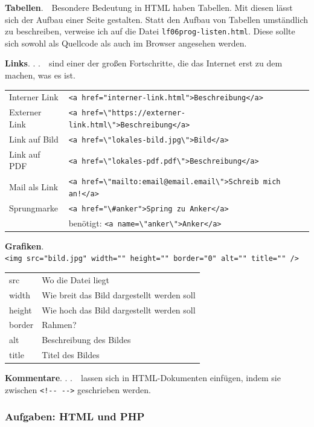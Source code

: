 {\bf Tabellen}.\ \ Besondere Bedeutung in HTML haben Tabellen. Mit diesen lässt sich der Aufbau einer Seite gestalten. Statt den Aufbau von Tabellen umständlich zu beschreiben, verweise ich auf die Datei \texttt{lf06prog-listen.html}. Diese sollte sich sowohl als Quellcode als auch im Browser angesehen werden.\newline

{\bf Links}. . .\ \ sind einer der großen Fortschritte, die das Internet erst zu dem machen, was es ist.
\begin{tabular}{lll}
Interner Link & \verb+<a href="interner-link.html">Beschreibung</a>+ &\\
Externer Link & \verb+<a href=\"https://externer-link.html\">Beschreibung</a>+ &\\
Link auf Bild & \verb+<a href=\"lokales-bild.jpg\">Bild</a>+ &\\
Link auf PDF & \verb+<a href=\"lokales-pdf.pdf\">Beschreibung</a>+ &\\
Mail als Link & \verb+<a href=\"mailto:email@email.email\">Schreib mich an!</a>+ &\\
Sprungmarke & \verb+<a href="\#anker">Spring zu Anker</a>+ &\\
& benötigt: \verb+<a name=\"anker\">Anker</a>+ &\\
\end{tabular}\newline

{\bf Grafiken}.\\
\verb+<img src="bild.jpg" width="" height="" border="0" alt="" title="" />+\\
\begin{tabular}{ll}
src & Wo die Datei liegt\\
width & Wie breit das Bild dargestellt werden soll\\
height & Wie hoch das Bild dargestellt werden soll\\
border & Rahmen?\\
alt & Beschreibung des Bildes\\
title & Titel des Bildes\\
\end{tabular}\newline

{\bf Kommentare}. . .\ \ lassen sich in HTML-Dokumenten einfügen, indem sie zwischen \verb+<!-- -->+ geschrieben werden.

\subsubsection{Aufgaben: HTML und PHP}



